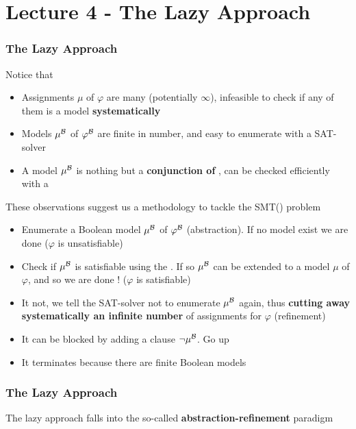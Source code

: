 \section{Lecture 4 - The Lazy Approach}

\begin{frame}
  \frametitle{The Lazy Approach}

  \scriptsize

  Notice that
  \begin{itemize}
    \item Assignments $\mu$ of $\varphi$ are many (potentially $\infty$),
          infeasible to check if any of them is a model {\bf systematically}
    \item Models $\mu^{\mathcal{B}}$ of $\varphi^{\mathcal{B}}$ are finite in number,
          and easy to enumerate with a SAT-solver
    \item A model $\mu^{\mathcal{B}}$ is nothing but a {\bf conjunction of \tatoms},
          can be checked efficiently with a \tsolver
  \end{itemize}
  \vfill
  These observations suggest us a methodology
  to tackle the SMT(\T) problem
  \begin{itemize}
    \item Enumerate a Boolean model $\mu^{\mathcal{B}}$ of $\varphi^{\mathcal{B}}$ (abstraction). If no model 
	  exist we are done ($\varphi$ is unsatisfiable) 
    \item Check if $\mu^{\mathcal{B}}$ is satisfiable using the \tsolver. If so $\mu^{\mathcal{B}}$ can be extended 
          to a model $\mu$ of $\varphi$, and so we are done ! ($\varphi$ is satisfiable) 
    \item It not, we tell the SAT-solver not to enumerate $\mu^{\mathcal{B}}$ again,
          thus {\bf cutting away systematically an infinite number} 
	  of assignments for $\varphi$ (refinement) 
    \item It can be blocked by adding a clause $\neg \mu^{\mathcal{B}}$. Go up
    \item It terminates because there are finite Boolean models
  \end{itemize}

\end{frame}

\begin{frame}
  \frametitle{The Lazy Approach}

  \scriptsize
  
  The lazy approach falls into the so-called {\bf abstraction-refinement} 
  paradigm
  \vfill
  \begin{center}
  \scalebox{.5}{}
  \end{center}

\end{frame}

